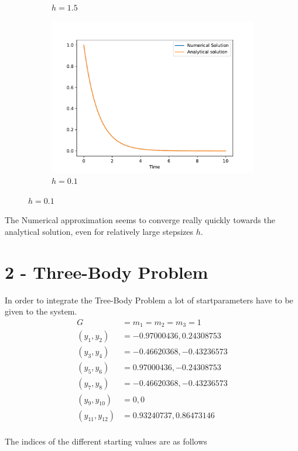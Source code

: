 \documentclass{article}
\begin{document}
\begin{figure}[ht]
\begin{subfigure}{.32\textwidth}
	\caption{$h = 1.5$} 	
    \end{subfigure}
    \begin{subfigure}{.32\textwidth}
	\includegraphics[width=\textwidth]{1_h_eq_0p1.pdf} 
	\caption{$h = 0.1$} 	
    \end{subfigure}
\end{figure}

The Numerical approximation seems to converge really quickly towards the
analytical solution, even for relatively large stepsizes \( h \).

\section*{2 - Three-Body Problem}

In order to integrate the Tree-Body Problem a lot of startparameters have to
be given to the system.
\begin{align*}
    G &= m_1 = m_2 = m_3 = 1 \\
    (y_1,y_2) & = −0.97000436 , 0.24308753 \\
    (y_3,y_4) & = −0.46620368 , -0.43236573 \\
    (y_5,y_6) & = 0.97000436 , -0.24308753 \\
    (y_7,y_8) & = −0.46620368 , -0.43236573 \\
    (y_9,y_{10}) & = 0 , 0 \\
    (y_{11},y_{12}) & = 0.93240737 , 0.86473146 \\
\end{align*}

The indices of the different starting values are as follows
\end{document}
